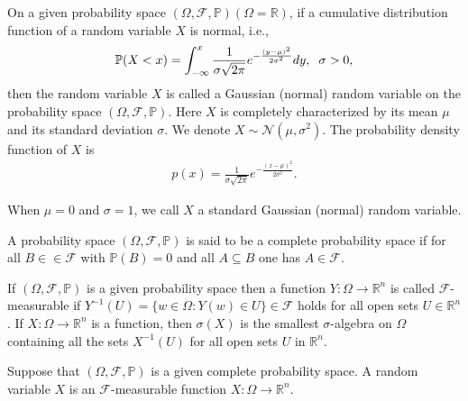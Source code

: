 	\noindent On a given probability space $(\Omega, \mathcal{F}, \mathbb{P}) (\Omega = \mathbb{R})$, if a cumulative distribution function of a random variable $X$ is normal, i.e.,
	\begin{align}
		\mathbb{P} (X < x) = \displaystyle \int_{-\infty}^{x} \frac{1}{ \sigma \sqrt{2 \pi} } e^{-\frac{(y - \mu)^2}{2 \sigma^2}} dy, \hspace{2mm} \sigma > 0,
	\end{align}
	then the random variable $X$ is called a Gaussian (normal) random variable on the probability space $(\Omega, \mathcal{F}, \mathbb{P})$. Here $X$ is completely characterized by its mean $\mu$ and its standard deviation $\sigma$. We denote $X \sim \mathcal{N} (\mu, \sigma^2)$. The probability density function of $X$ is
	\begin{align*}
		p(x) = \frac{1}{\sigma \sqrt{2 \pi}} e^{-\frac{(x - \mu)^2}{2 \sigma^2}}.
	\end{align*}

	\noindent When $\mu = 0$ and $\sigma = 1$, we call $X$ a standard Gaussian (normal) random variable.
	
	\begin{definition}
		A probability space $(\Omega, \mathcal{F}, \mathbb{P})$ is said to be a complete probability space if for all $B ∈\in \mathcal{F}$ with $\mathbb{P} (B) = 0$ and all $A \subseteq B$ one has $A \in \mathcal{F}$.
	\end{definition}
	
	\begin{definition}
		If $(\Omega, \mathcal{F}, \mathbb{P})$ is a given probability space then a function $Y : \Omega \rightarrow \mathbb{R}^n$ is called $\mathcal{F}$-measurable if $Y^{-1} (U) = \{ w \in \Omega : Y(w) \in U \} \in \mathcal{F}$ holds for all open sets $U \in \mathbb{R}^n$. If $X : \Omega \rightarrow \mathbb{R}^n$ is a function, then $\sigma (X)$ is the smallest $\sigma$-algebra on $\Omega$ containing all the sets $X^{-1} (U)$ for all open sets $U$ in $\mathbb{R}^n$.
	\end{definition}
	
	\begin{definition}
		Suppose that $(\Omega, \mathcal{F}, \mathbb{P})$ is a given complete probability space. A random variable $X$ is an $\mathcal{F}$-measurable function $X : \Omega \rightarrow \mathbb{R}^n$.
	\end{definition}
	
